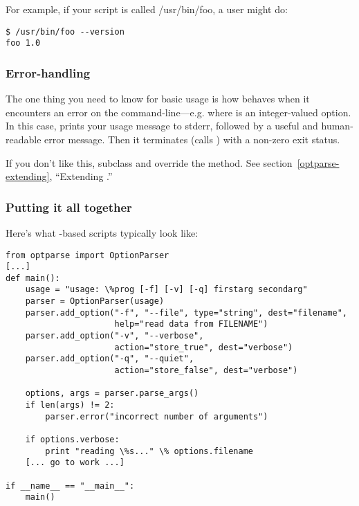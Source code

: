 For example, if your script is called /usr/bin/foo, a user might do:

\begin{verbatim}
$ /usr/bin/foo --version
foo 1.0
\end{verbatim} %

\subsubsection{Error-handling\label{optparse-error-handling}}

The one thing you need to know for basic usage is how
 behaves when it encounters an error on the
command-line---e.g.  where  is an
integer-valued option.  In this case,  prints your
usage message to stderr, followed by a useful and human-readable error
message.  Then it terminates (calls ) with a
non-zero exit status.

If you don't like this, subclass  and override the
 method.  See section~\ref{optparse-extending},
``Extending .''

\subsubsection{Putting it all together\label{optparse-basic-summary}}

Here's what -based scripts typically look like:

\begin{verbatim}
from optparse import OptionParser
[...]
def main():
    usage = "usage: \%prog [-f] [-v] [-q] firstarg secondarg"
    parser = OptionParser(usage)
    parser.add_option("-f", "--file", type="string", dest="filename",
                      help="read data from FILENAME")
    parser.add_option("-v", "--verbose",
                      action="store_true", dest="verbose")
    parser.add_option("-q", "--quiet",
                      action="store_false", dest="verbose")

    options, args = parser.parse_args()
    if len(args) != 2:
        parser.error("incorrect number of arguments")

    if options.verbose:
        print "reading \%s..." \% options.filename
    [... go to work ...]

if __name__ == "__main__":
    main()
\end{verbatim}

